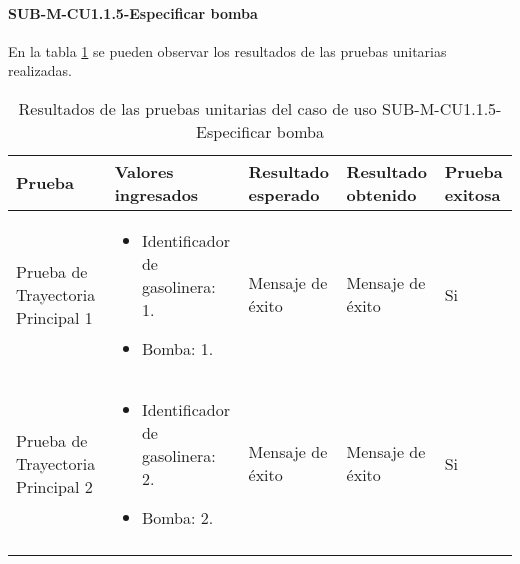 \paragraph{SUB-M-CU1.1.5-Especificar bomba}\label{SUB-M-CU1.1.5:Pruebas}
En la tabla \ref{pruebas_unitarias_sub-m-cu1.1.5} se pueden observar los resultados de las pruebas unitarias realizadas.
\begin{longtable}{|M{2cm}| M{4.5cm}|M{3cm}|M{3cm}|M{1.5cm}|}
	\hline
	\textbf{Prueba} & \textbf{Valores ingresados} & \textbf{Resultado esperado} & \textbf{Resultado obtenido} & \textbf{Prueba exitosa} \\ \hline
	Prueba de Trayectoria Principal 1& 
	\begin{itemize}
		\item Identificador de gasolinera: 1.
		\item Bomba: 1.
	\end{itemize}
	& Mensaje de éxito  & Mensaje de éxito & Si \\ \hline
	Prueba de Trayectoria Principal 2& 
	\begin{itemize}
		\item Identificador de gasolinera: 2.
		\item Bomba: 2.
	\end{itemize}
	& Mensaje de éxito & Mensaje de éxito & Si \\ \hline
	\caption{Resultados de las pruebas unitarias del caso de uso SUB-M-CU1.1.5-Especificar bomba}
	\label{pruebas_unitarias_sub-m-cu1.1.5}
\end{longtable}
